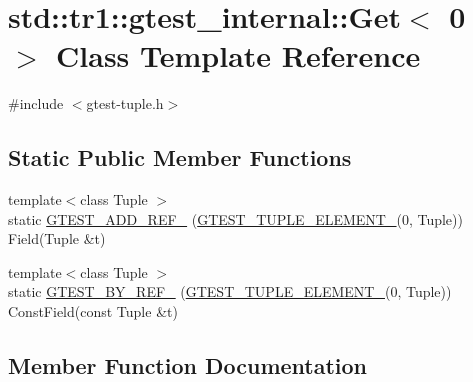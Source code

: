 \hypertarget{classstd_1_1tr1_1_1gtest__internal_1_1_get_3_010_01_4}{}\section{std\+:\+:tr1\+:\+:gtest\+\_\+internal\+:\+:Get$<$ 0 $>$ Class Template Reference}
\label{classstd_1_1tr1_1_1gtest__internal_1_1_get_3_010_01_4}


{\ttfamily \#include $<$gtest-\/tuple.\+h$>$}

\subsection*{Static Public Member Functions}
\begin{DoxyCompactItemize}
\item 
{\footnotesize template$<$class Tuple $>$ }\\static \hyperlink{classstd_1_1tr1_1_1gtest__internal_1_1_get_3_010_01_4_a74beca3869fddfe42ee608b7f4cacb96}{G\+T\+E\+S\+T\+\_\+\+A\+D\+D\+\_\+\+R\+E\+F\+\_\+} (\hyperlink{gtest-tuple_8h_a1b7f133d8aa02e0b7afed7b66781eeb7}{G\+T\+E\+S\+T\+\_\+\+T\+U\+P\+L\+E\+\_\+\+E\+L\+E\+M\+E\+N\+T\+\_\+}(0, Tuple)) Field(Tuple \&t)
\item 
{\footnotesize template$<$class Tuple $>$ }\\static \hyperlink{classstd_1_1tr1_1_1gtest__internal_1_1_get_3_010_01_4_a195b3853de45077f9a324c455f22d7e2}{G\+T\+E\+S\+T\+\_\+\+B\+Y\+\_\+\+R\+E\+F\+\_\+} (\hyperlink{gtest-tuple_8h_a1b7f133d8aa02e0b7afed7b66781eeb7}{G\+T\+E\+S\+T\+\_\+\+T\+U\+P\+L\+E\+\_\+\+E\+L\+E\+M\+E\+N\+T\+\_\+}(0, Tuple)) Const\+Field(const Tuple \&t)
\end{DoxyCompactItemize}


\subsection{Member Function Documentation}
\mbox{\label{classstd_1_1tr1_1_1gtest__internal_1_1_get_3_010_01_4_a74beca3869fddfe42ee608b7f4cacb96}} 
